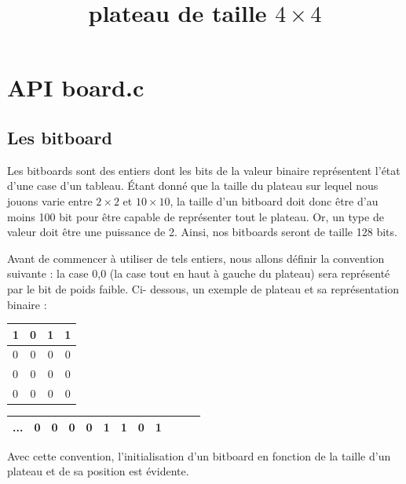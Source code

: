 \documentclass{report}
\begin{document}
\section{API board.c}
\subsection{Les bitboard}

Les bitboards sont des entiers dont les bits de la valeur binaire représentent l'état d'une case d'un tableau. \'Etant donné que la taille du plateau sur lequel nous jouons varie entre $2\times2$ et $10\times10$, la taille d'un bitboard doit donc être d'au moins 100 bit pour être capable de représenter tout le plateau. Or, un type de valeur doit être une puissance de 2. Ainsi, nos bitboards seront de taille 128 bits.

Avant de commencer à utiliser de tels entiers, nous allons définir la convention suivante : la case 0,0 (la case tout en haut à gauche du plateau) sera représenté par le bit de poids faible.\newline
\newline
Ci- dessous, un exemple de plateau et sa représentation binaire :
\begin{center}

\renewcommand{\arraystretch} {1.5}
    \begin{tabular}{|p{0.2cm}|c|c|c|}
        \hline
        1 & 0 & 1 & 1\\
        \hline
        0 & 0 & 0 & 0 \\
        \hline
        0 & 0 & 0 & 0 \\
        \hline
        0 & 0 & 0 & 0 \\
        \hline
    \end{tabular}

\end{center}
\begin{center}
        \title{plateau de taille $4\times4$}
\end{center}

\begin{center}
\renewcommand{\arraystretch} {1.5}
       \begin{tabular}{|c|c|c|c|c|c|c|c|c|c|c|c|}
        \hline
        ... & 0 & 0 & 0 & 0 & 1 & 1 & 0 & 1 \\
        \hline
    \end{tabular}
\end{center}

Avec cette convention, l'initialisation d'un bitboard en fonction de la taille d'un plateau et de sa position est évidente.
\end{document}
